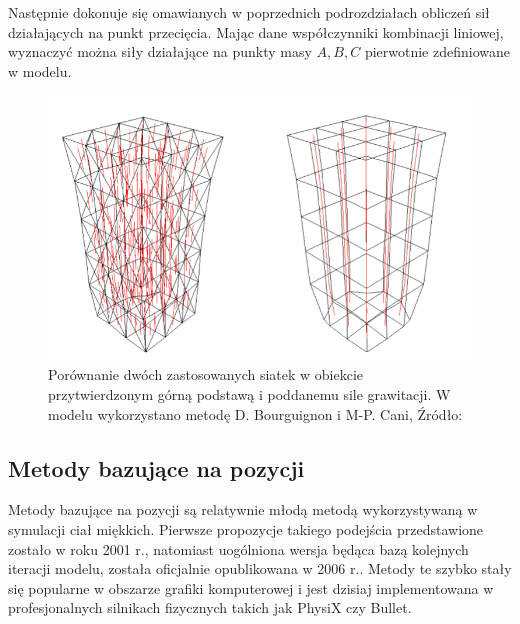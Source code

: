 Następnie dokonuje się omawianych w poprzednich podrozdziałach obliczeń sił działających na punkt przecięcia. Mając dane współczynniki kombinacji liniowej, wyznaczyć można siły działające na punkty masy $A,B,C$ pierwotnie zdefiniowane w modelu. 

\begin{figure}[ht]
\centering
\includegraphics[scale=0.5]{images/fixed_anisotropy.png}
\caption{Porównanie dwóch zastosowanych siatek w obiekcie przytwierdzonym górną podstawą i poddanemu sile grawitacji. W modelu wykorzystano metodę D. Bourguignon i M-P. Cani, Źródło: \cite{ca}}
\label{anizotropia-czworoscian-fix}
\end{figure}

\subsection{Metody bazujące na pozycji}
Metody bazujące na pozycji są relatywnie młodą metodą wykorzystywaną w symulacji
ciał miękkich. Pierwsze propozycje takiego podejścia przedstawione zostało w
roku 2001 r.\cite{jak}, natomiast uogólniona wersja będąca bazą kolejnych
iteracji modelu, została oficjalnie opublikowana w 2006 r.\cite{pbdyn}. Metody te
szybko stały się popularne w obszarze grafiki komputerowej i jest dzisiaj
implementowana w profesjonalnych silnikach fizycznych takich jak PhysiX czy
Bullet.

